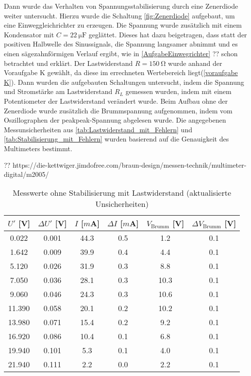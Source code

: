 \documentclass{article}
\begin{document}
Dann wurde das Verhalten von Spannungsstabilisierung durch eine Zenerdiode weiter untersucht. Hierzu wurde die Schaltung 
\autoref{fig:Zenerdiode} aufgebaut, um eine Einweggleichrichter zu erzeugen. Die Spannung wurde zusätzlich mit
 einem Kondensator mit $C= \SI{22}{\micro \farad}$ geglättet. Dieses hat dazu beigetragen, dass statt der positiven 
 Halbwelle des Sinussignals, die Spannung langsamer abnimmt und es einen sägezahnförmigen Verlauf ergibt, wie
  in \autoref{AufgabeEinwegrichter} ?? schon betrachtet und erklärt.
Der Lastwiderstand $R= \SI{150}{\ohm}$ wurde anhand der Voraufgabe K gewählt, da diese im errechneten Wertebereich 
liegt(\autoref{voraufgabe K}). Dann wurden die aufgebauten Schaltungen untersucht, indem die Spannung und Stromstärke
 am Lastwiderstand $R_L$ gemessen wurden, indem mit einem Potentiometer der Lastwiderstand verändert wurde. Beim Aufbau
  ohne der Zenerdiode wurde zusätzlich die Brummspannung aufgenommen, indem vom Oszillographen der peakpeak-Spannung abgelesen wurde.
   Die angegebenen Messunsicherheiten aus \autoref{tab:Lastwiderstand_mit_Fehlern} und \autoref{tab:Stabilisierung_mit_Fehlern} wurden
    basierend auf die Genauigkeit des Multimeters bestimmt. \cite{Digitalmultimeter}

??
https://die-kettwiger.jimdofree.com/braun-design/messen-technik/multimeter-digital/m2005/


\begin{table}[h!]
\centering
\begin{tabular}{|c|c|c|c|c|c|}
\hline
\textbf{$U'$ [V]} & \textbf{$\Delta U'$ [V]} & \textbf{$I$ [$m$A]} & \textbf{$\Delta I$ [$m$A]} & \textbf{$V_\text{Brumm}$ [V]} & \textbf{$\Delta V_\text{Brumm}$ [V]} \\
\hline
0.022 & 0.001 & 44.3 & 0.5 & 1.2 & 0.1 \\
1.642 & 0.009 & 39.9 & 0.4 & 4.4 & 0.1 \\
5.120 & 0.026 & 31.9 & 0.3 & 8.8 & 0.1 \\
7.050 & 0.036 & 28.1 & 0.3 & 10.3 & 0.1 \\
9.060 & 0.046 & 24.3 & 0.3 & 10.6 & 0.1 \\
11.390 & 0.058 & 20.1 & 0.2 & 10.2 & 0.1 \\
13.980 & 0.071 & 15.4 & 0.2 & 9.2 & 0.1 \\
16.920 & 0.086 & 10.4 & 0.1 & 6.8 & 0.1 \\
19.940 & 0.101 & 5.3 & 0.1 & 4.0 & 0.1 \\
21.940 & 0.111 & 2.2 & 0.0 & 2.2 & 0.1 \\
\hline
\end{tabular}
\caption{Messwerte ohne Stabilisierung mit Lastwiderstand (aktualisierte Unsicherheiten)}
\label{tab:Lastwiderstand_mit_Fehlern}
\end{table}
\end{document}
